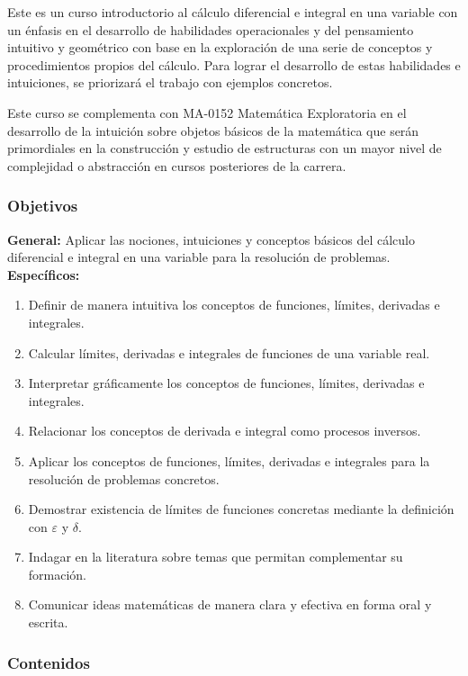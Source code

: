 \begin{refsection}
Este es un curso introductorio al cálculo diferencial e integral en una variable con un énfasis en el desarrollo de habilidades operacionales y del pensamiento intuitivo y geométrico con base en la exploración de una serie de conceptos y procedimientos propios del cálculo. Para lograr el desarrollo de estas habilidades e intuiciones, se priorizará el trabajo con ejemplos concretos.

Este curso se complementa con MA-0152 Matemática Exploratoria en el desarrollo de la intuición sobre objetos básicos de la matemática que serán primordiales en la construcción y estudio de estructuras con un mayor nivel de complejidad o abstracción en cursos posteriores de la carrera.




\subsubsection*{Objetivos}

\textbf{General:} Aplicar las nociones, intuiciones y conceptos básicos del cálculo diferencial e integral en una variable para la resolución de problemas. \\

\textbf{Específicos:}

\begin{enumerate}
\item Definir de manera intuitiva los conceptos de funciones, límites, derivadas e integrales.
\item Calcular límites, derivadas e integrales de funciones de una variable real.
\item Interpretar gráficamente los conceptos de funciones, límites, derivadas e integrales.
\item Relacionar los conceptos de derivada e integral como procesos inversos.
\item Aplicar los conceptos de funciones, límites, derivadas e integrales para la resolución de problemas concretos.
\item Demostrar existencia de límites de funciones concretas mediante la definición con $\varepsilon$ y $\delta$.
\item Indagar en la literatura sobre temas que permitan complementar su formación.
\item Comunicar ideas matemáticas de manera clara y efectiva en forma oral y escrita.
\end{enumerate}

\subsubsection*{Contenidos}


\end{refsection}

